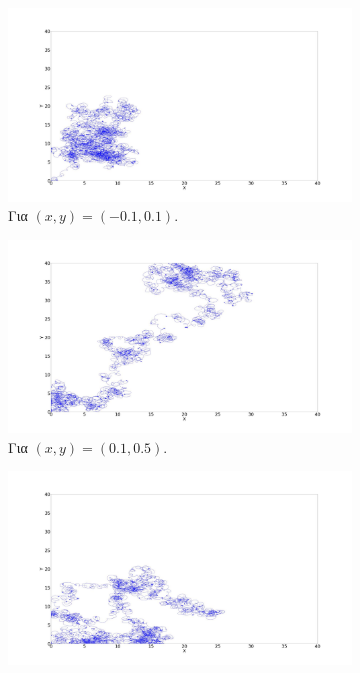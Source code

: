 \begin{figure}[ht]
	\centering
	\begin{subfigure}[b]{0.55\textwidth}
		\centering
		\includegraphics[width=\textwidth]{LateX images/log/xy/g1-1.4}
		\caption{Για $(x,y) = (-0.1,0.1)$.}
		\label{f:g94}
	\end{subfigure}
	\hfill
	\begin{subfigure}[b]{0.55\textwidth}
		\centering
		\includegraphics[width=\textwidth]{LateX images/log/xy/g2-1.4}
		\caption{Για $(x,y) = (0.1,0.5)$.}
		\label{f:g95}
	\end{subfigure}
	\hfill
	\begin{subfigure}[b]{0.55\textwidth}
		\centering
		\includegraphics[width=\textwidth]{LateX images/log/xy/g3-1.4}

\end{subfigure}
\end{figure}
